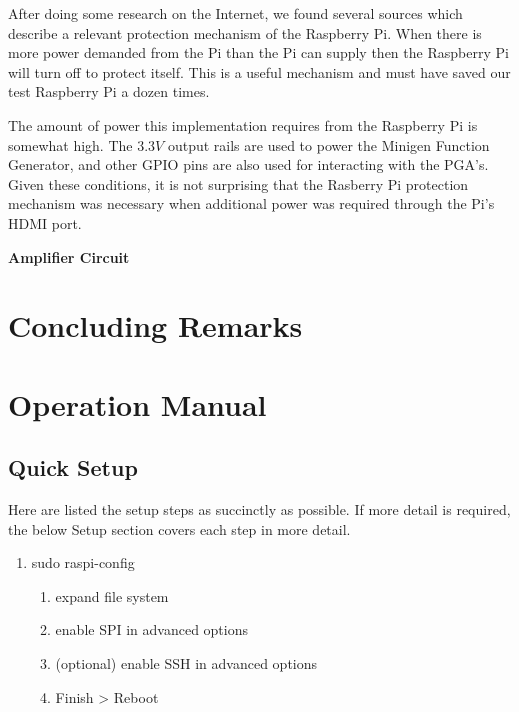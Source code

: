 \documentclass{article}	%
\begin{document}
\begin{multicols}{2}
After doing some research on the Internet,
we found several sources which describe 
a relevant protection mechanism of the Raspberry Pi.
When there is more power demanded from the Pi than
the Pi can supply then
the Raspberry Pi will turn off to protect itself.
This is a useful mechanism and must have 
saved our test Raspberry Pi a dozen times.

The amount of power this implementation
requires from the Raspberry Pi is somewhat high.
The $3.3V$ output rails are used to power the
Minigen Function Generator, and
other GPIO pins are also used for interacting
with the PGA's.
Given these conditions,
it is not surprising that the Rasberry Pi 
protection mechanism was necessary
when additional power was required
through the Pi's HDMI port.

\textbf{Amplifier Circuit}

\section{Concluding Remarks}

\pagebreak
\appendix

\section{Operation Manual}
\subsection{Quick Setup}
Here are listed the setup steps
as succinctly as possible.
If more detail is required,
the below Setup section covers
each step in more detail.
\begin{enumerate}
\item sudo raspi-config
    \begin{enumerate}
    \item expand file system
    \item enable SPI in advanced options
    \item (optional) enable SSH in advanced options
    \item Finish > Reboot
    \end{enumerate}


\end{enumerate}
\end{multicols}
\end{document}

